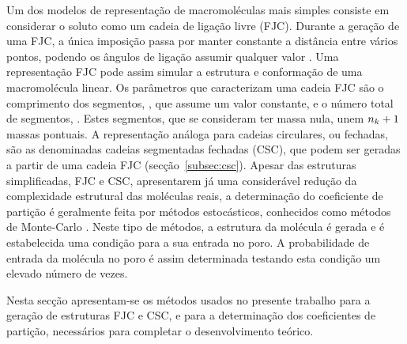 Um dos modelos de representação de macromoléculas mais simples consiste em considerar o soluto como um cadeia de ligação livre (FJC).
Durante a geração de uma FJC, a única imposição passa por manter constante a distância entre vários pontos, podendo os ângulos de ligação assumir qualquer valor \cite{teraoka}. Uma representação FJC pode assim simular a estrutura e conformação de uma macromolécula linear. Os parâmetros que caracterizam uma cadeia FJC são o comprimento dos segmentos, \comsegmento, que assume um valor constante, e o número total de segmentos, \numsegmento. 
Estes segmentos, que se consideram ter massa nula, unem $n_{k} +1$ massas pontuais. A representação análoga para cadeias circulares, ou fechadas, são as denominadas cadeias segmentadas fechadas (CSC), que podem ser geradas a partir de uma cadeia FJC (secção~\ref{subsec:csc}).
Apesar das estruturas simplificadas, FJC e CSC, apresentarem já uma considerável redução da complexidade estrutural das moléculas reais, a determinação do coeficiente de partição é geralmente feita por métodos estocásticos, conhecidos como métodos de Monte-Carlo \cite{davidson87,cifra,hermsen}. 
Neste tipo de métodos, a estrutura da molécula é gerada e é estabelecida uma condição para a sua entrada no poro. A probabilidade de entrada da molécula no poro é assim determinada testando esta condição um elevado número de vezes.

Nesta secção apresentam-se os métodos usados no presente trabalho para a geração de estruturas FJC e CSC, e para a determinação dos coeficientes de partição, necessários para completar o desenvolvimento teórico. 

